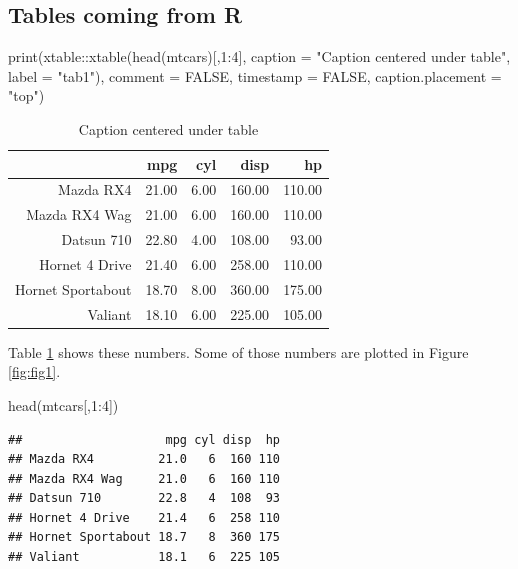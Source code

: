 \documentclass[useAMS,usenatbib,referee]{biom}
\newenvironment{Shaded}{\begin{snugshade}}{\end{snugshade}}
\newcommand{\AttributeTok}[1]{\textcolor[rgb]{0.77,0.63,0.00}{#1}}
\newcommand{\ConstantTok}[1]{\textcolor[rgb]{0.00,0.00,0.00}{#1}}
\newcommand{\DecValTok}[1]{\textcolor[rgb]{0.00,0.00,0.81}{#1}}
\newcommand{\FunctionTok}[1]{\textcolor[rgb]{0.00,0.00,0.00}{#1}}
\newcommand{\NormalTok}[1]{#1}
\newcommand{\SpecialCharTok}[1]{\textcolor[rgb]{0.00,0.00,0.00}{#1}}
\newcommand{\StringTok}[1]{\textcolor[rgb]{0.31,0.60,0.02}{#1}}
\begin{document}
\clearpage

\hypertarget{tables-coming-from-r}{%
\subsection{Tables coming from R}\label{tables-coming-from-r}}

\begin{Shaded}
\begin{Highlighting}[]
\FunctionTok{print}\NormalTok{(xtable}\SpecialCharTok{::}\FunctionTok{xtable}\NormalTok{(}\FunctionTok{head}\NormalTok{(mtcars)[,}\DecValTok{1}\SpecialCharTok{:}\DecValTok{4}\NormalTok{], }
\AttributeTok{caption =} \StringTok{"Caption centered under table"}\NormalTok{, }\AttributeTok{label =} \StringTok{"tab1"}\NormalTok{), }
\AttributeTok{comment =} \ConstantTok{FALSE}\NormalTok{, }\AttributeTok{timestamp =} \ConstantTok{FALSE}\NormalTok{, }\AttributeTok{caption.placement =} \StringTok{"top"}\NormalTok{)}
\end{Highlighting}
\end{Shaded}

\begin{table}[ht]
\centering
\caption{Caption centered under table} 
\label{tab1}
\begin{tabular}{rrrrr}
  \hline
 & mpg & cyl & disp & hp \\ 
  \hline
Mazda RX4 & 21.00 & 6.00 & 160.00 & 110.00 \\ 
  Mazda RX4 Wag & 21.00 & 6.00 & 160.00 & 110.00 \\ 
  Datsun 710 & 22.80 & 4.00 & 108.00 & 93.00 \\ 
  Hornet 4 Drive & 21.40 & 6.00 & 258.00 & 110.00 \\ 
  Hornet Sportabout & 18.70 & 8.00 & 360.00 & 175.00 \\ 
  Valiant & 18.10 & 6.00 & 225.00 & 105.00 \\ 
   \hline
\end{tabular}
\end{table}

Table \ref{tab1} shows these numbers. Some of those numbers are plotted
in Figure \ref{fig:fig1}.

\begin{Shaded}
\begin{Highlighting}[]
\FunctionTok{head}\NormalTok{(mtcars[,}\DecValTok{1}\SpecialCharTok{:}\DecValTok{4}\NormalTok{])}
\end{Highlighting}
\end{Shaded}

\begin{verbatim}
##                    mpg cyl disp  hp
## Mazda RX4         21.0   6  160 110
## Mazda RX4 Wag     21.0   6  160 110
## Datsun 710        22.8   4  108  93
## Hornet 4 Drive    21.4   6  258 110
## Hornet Sportabout 18.7   8  360 175
## Valiant           18.1   6  225 105
\end{verbatim}






\label{lastpage}
\end{document}
